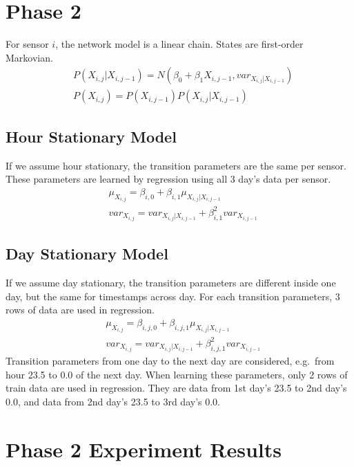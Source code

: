 \documentclass[12pt]{article}  %
\theoremstyle{definition}
\theoremstyle{remark}
\begin{document}
\section{Phase 2}
For sensor $i$, the network model is a linear chain.
States are first-order Markovian.
\begin{align}
        & P(X_{i,j}|X_{i,j-1}) = N(\beta_0 + \beta_1 X_{i,j-1}, var_{X_{i,j}|X_{i,j-1}}) \\
        & P(X_{i,j}) = P(X_{i, j-1})P(X_{i,j}|X_{i, j-1})
\end{align}

\subsection{Hour Stationary Model}
If we assume hour stationary, the transition parameters are the same per sensor.
These parameters are learned by regression using all 3 day's data per sensor.
\begin{align}
        & \mu_{X_{i,j}} = \beta_{i,0} + \beta_{i,1} \mu_{X_{i,j}|X_{i,j-1}} \\
        & var_{X_{i,j}} = var_{X_{i,j}|X_{i,j-1}} + \beta_{i,1}^2 var_{X_{i,j-1}} 
\end{align}


\subsection{Day Stationary Model}
If we assume day stationary, the transition parameters are different inside one day,
but the same for timestamps across day.
For each transition parameters, 3 rows of data are used in regression.
\begin{align}
        & \mu_{X_{i,j}} = \beta_{i,j,0} + \beta_{i,j,1} \mu_{X_{i,j}|X_{i,j-1}} \\
        & var_{X_{i,j}} = var_{X_{i,j}|X_{i,j-1}} + \beta_{i,j,1}^2 var_{X_{i,j-1}} 
\end{align}
Transition parameters from one day to the next day are considered,
e.g.\ from hour 23.5 to 0.0 of the next day.
When learning these parameters, only 2 rows of train data are used in regression.
They are data from 1st day's 23.5 to 2nd day's 0.0,
and data from 2nd day's 23.5 to 3rd day's 0.0.


\section{Phase 2 Experiment Results}
\label{sec:phase2:result}
\end{document}
